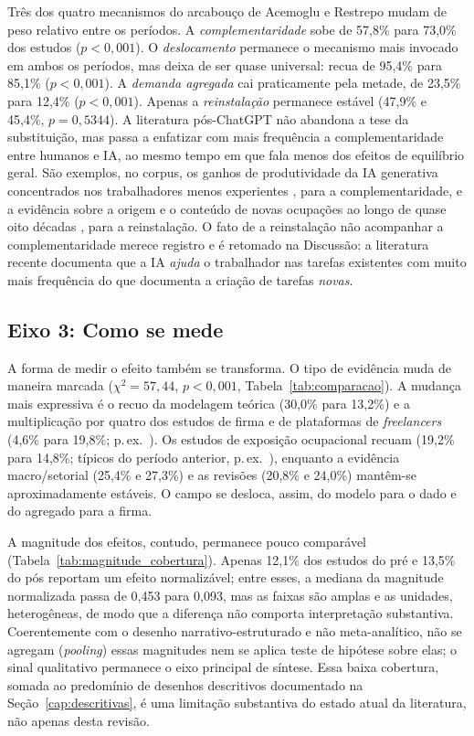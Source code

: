 Três dos quatro mecanismos do arcabouço de Acemoglu e Restrepo mudam de peso relativo entre os períodos. A \emph{complementaridade} sobe de 57,8\% para 73,0\% dos estudos ($p < 0{,}001$). O \emph{deslocamento} permanece o mecanismo mais invocado em ambos os períodos, mas deixa de ser quase universal: recua de 95,4\% para 85,1\% ($p < 0{,}001$). A \emph{demanda agregada} cai praticamente pela metade, de 23,5\% para 12,4\% ($p < 0{,}001$). Apenas a \emph{reinstalação} permanece estável (47,9\% e 45,4\%, $p = 0{,}5344$). A literatura pós-ChatGPT não abandona a tese da substituição, mas passa a enfatizar com mais frequência a complementaridade entre humanos e IA, ao mesmo tempo em que fala menos dos efeitos de equilíbrio geral. São exemplos, no corpus, os ganhos de produtividade da IA generativa concentrados nos trabalhadores menos experientes \parencite{brynjolfssonLiRaymond2025}, para a complementaridade, e a evidência sobre a origem e o conteúdo de novas ocupações ao longo de quase oito décadas \parencite{autorNewFrontiers2024}, para a reinstalação. O fato de a reinstalação não acompanhar a complementaridade merece registro e é retomado na Discussão: a literatura recente documenta que a IA \emph{ajuda} o trabalhador nas tarefas existentes com muito mais frequência do que documenta a criação de tarefas \emph{novas}.

\subsection{Eixo 3: Como se mede}

A forma de medir o efeito também se transforma. O tipo de evidência muda de maneira marcada ($\chi^2 = 57{,}44$, $p < 0{,}001$, Tabela~\ref{tab:comparacao}). A mudança mais expressiva é o recuo da modelagem teórica (30,0\% para 13,2\%) e a multiplicação por quatro dos estudos de firma e de plataformas de \textit{freelancers} (4,6\% para 19,8\%; p.\,ex.\ \textcite{bessenGoosSalomons2025, hemous2025}). Os estudos de exposição ocupacional recuam (19,2\% para 14,8\%; típicos do período anterior, p.\,ex.\ \textcite{lordanNeumark2018}), enquanto a evidência macro/setorial (25,4\% e 27,3\%) e as revisões (20,8\% e 24,0\%) mantêm-se aproximadamente estáveis. O campo se desloca, assim, do modelo para o dado e do agregado para a firma.

A magnitude dos efeitos, contudo, permanece pouco comparável (Tabela~\ref{tab:magnitude_cobertura}). Apenas 12,1\% dos estudos do pré e 13,5\% do pós reportam um efeito normalizável; entre esses, a mediana da magnitude normalizada passa de 0,453 para 0,093, mas as faixas são amplas e as unidades, heterogêneas, de modo que a diferença não comporta interpretação substantiva. Coerentemente com o desenho narrativo-estruturado e não meta-analítico, não se agregam (\textit{pooling}) essas magnitudes nem se aplica teste de hipótese sobre elas; o sinal qualitativo permanece o eixo principal de síntese. Essa baixa cobertura, somada ao predomínio de desenhos descritivos documentado na Seção~\ref{cap:descritivas}, é uma limitação substantiva do estado atual da literatura, não apenas desta revisão.

